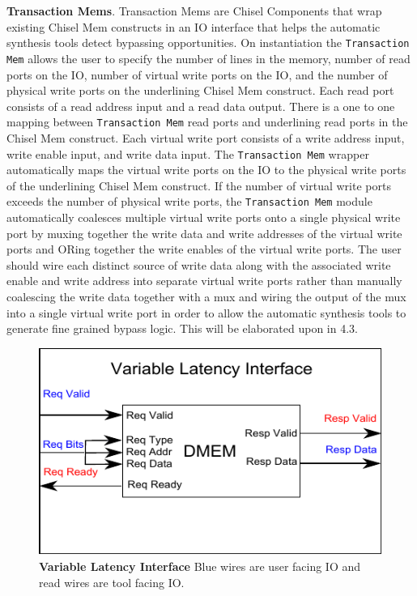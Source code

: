 {\bf Transaction Mems}. Transaction Mems are Chisel Components that
wrap existing Chisel Mem constructs in an IO interface that helps the
automatic synthesis tools detect bypassing opportunities. On
instantiation the {\tt Transaction Mem} allows the user to specify the
number of lines in the memory, number of read ports on the IO, number
of virtual write ports on the IO, and the number of physical write
ports on the underlining Chisel Mem construct. Each read port consists
of a read address input and a read data output. There is a one to one
mapping between {\tt Transaction Mem} read ports and underlining read ports
in the Chisel Mem construct. Each virtual write port consists of a
write address input, write enable input, and write data input. The
{\tt Transaction Mem} wrapper automatically maps the virtual write ports on
the IO to the physical write ports of the underlining Chisel Mem
construct. If the number of virtual write ports exceeds the number of
physical write ports, the {\tt Transaction Mem} module automatically
coalesces multiple virtual write ports onto a single physical write
port by muxing together the write data and write addresses of the
virtual write ports and ORing together the write enables of the
virtual write ports. The user should wire each distinct source of
write data along with the associated write enable and write address
into separate virtual write ports rather than manually coalescing the
write data together with a mux and wiring the output of the mux into
a single virtual write port in order to allow the automatic synthesis
tools to generate fine grained bypass logic. This will be elaborated
upon in 4.3.
\begin{figure}[htb]
\centering
\includegraphics{figures/VLI.pdf}
\caption{{\bf Variable Latency Interface} Blue wires are user facing IO and read wires are tool facing IO.}
\label{fig:vli}
\end{figure}

